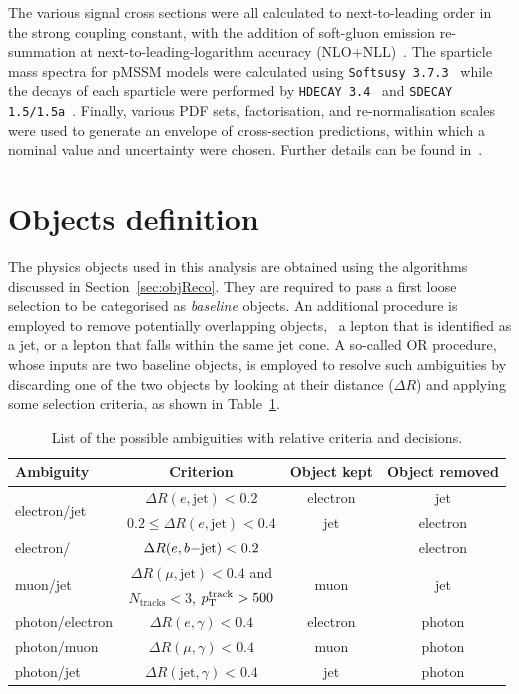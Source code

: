 			The various signal cross sections were all calculated to next-to-leading order in the strong coupling constant, with the addition of soft-gluon emission re-summation at next-to-leading-logarithm accuracy (NLO+NLL)~\cite{Beenakker:1997ut, Beenakker:2010nq, Beenakker:2011fu}. The sparticle mass spectra for \ac{pMSSM} models were calculated using \texttt{Softsusy 3.7.3}~\cite{Allanach:2001kg, Allanach:2013kza} while the decays of each sparticle were performed by \texttt{HDECAY 3.4}~\cite{hdecay} and \texttt{SDECAY 1.5/1.5a}~\cite{sdecay}. Finally, various \ac{PDF} sets, factorisation, and re-normalisation scales were used to generate an envelope of cross-section predictions, within which a nominal value and uncertainty were chosen. Further details can be found in~\cite{Borschensky:2014cia}.


	\section{Objects definition}
	\label{sec:obj_def}
			
		The physics objects used in this analysis are obtained using the algorithms discussed in Section~\ref{sec:objReco}. They are required to pass a first loose selection to be categorised as \emph{baseline} objects. An additional procedure is employed to remove potentially overlapping objects, \eg\ a lepton that is identified as a jet, or a lepton that falls within the same jet cone. A so-called \ac{OR} procedure, whose inputs are two baseline objects, is employed to resolve such ambiguities by discarding one of the two objects by looking at their distance ($\Delta R$) and applying some selection criteria, as shown in Table~\ref{tab:OR}. 

		\begin{table}[!htb]\centering\caption{List of the possible ambiguities with relative criteria and decisions.}
		\renewcommand{\arraystretch}{1.3}
			\begin{tabular}{lccc}
				\toprule 
				\textbf{Ambiguity} & \textbf{Criterion} & \textbf{Object kept} & \textbf{Object removed}\\
				\toprule
				\multirow{2}{*}{electron/jet} & $\Delta R (e,\mathrm{jet}) < 0.2$ & electron & jet\\
				& $0.2 \leq \Delta R (e,\mathrm{jet}) < 0.4$ & jet & electron \\\midrule
				electron/\bj & $\Delta R (e,b\mathrm{-jet}) < 0.2$ & \bj\ & electron\\ \midrule
				\multirow{2}{*}{muon/jet} & $\Delta R (\mu,\mathrm{jet}) < 0.4$ and & \multirow{2}{*}{muon} & \multirow{2}{*}{jet} \\ 
						& $N_{\mathrm{tracks}} < 3$, $p_{\mathrm{T}}^{\mathrm{track}} > 500$ \MeV &  &  \\ \midrule
				photon/electron & $\Delta R (e,\gamma) < 0.4$ & electron & photon\\ 
				photon/muon & $\Delta R (\mu,\gamma) < 0.4$ & muon & photon\\ 
				photon/jet & $\Delta R (\mathrm{jet}, \gamma) < 0.4$ & jet & photon\\ 
				\bottomrule
				\end{tabular}
				\label{tab:OR}
		\end{table}


